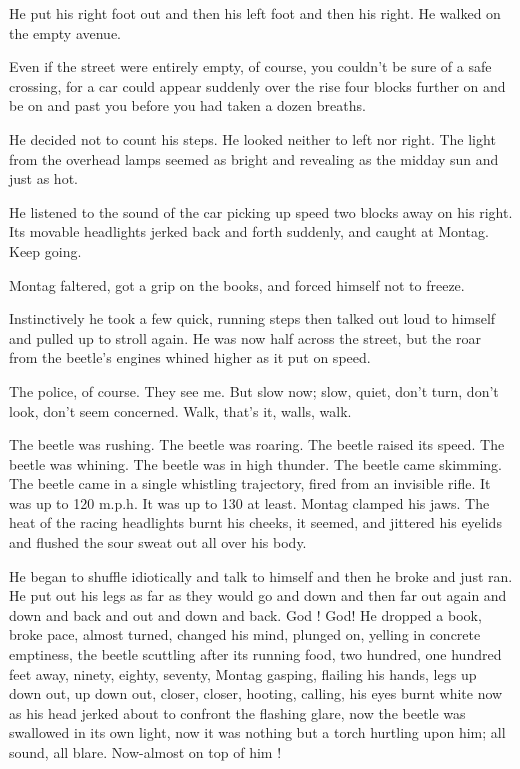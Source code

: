 \documentclass[11pt,openany]{book}
\begin{document}
He put his right foot out and then his left foot and then his right. He walked on the empty avenue.

Even if the street were entirely empty, of course, you couldn't be sure of a safe crossing, for a car could appear suddenly over the rise four blocks further on and be on and past you before you had taken a dozen breaths.

He decided not to count his steps. He looked neither to left nor right. The light from the overhead lamps seemed as bright and revealing as the midday sun and just as hot.

He listened to the sound of the car picking up speed two blocks away on his right. Its movable headlights jerked back and forth suddenly, and caught at Montag. Keep going.

Montag faltered, got a grip on the books, and forced himself not to freeze.

Instinctively he took a few quick, running steps then talked out loud to himself and pulled up to stroll again. He was now half across the street, but the roar from the beetle's engines whined higher as it put on speed.

The police, of course. They see me. But slow now; slow, quiet, don't turn, don't look, don't seem concerned. Walk, that's it, walls, walk.

The beetle was rushing. The beetle was roaring. The beetle raised its speed. The beetle was whining. The beetle was in high thunder. The beetle came skimming. The beetle came in a single whistling trajectory, fired from an invisible rifle. It was up to 120 m.p.h. It was up to 130 at least. Montag clamped his jaws. The heat of the racing headlights burnt his cheeks, it seemed, and jittered his eyelids and flushed the sour sweat out all over his body.

He began to shuffle idiotically and talk to himself and then he broke and just ran. He put out his legs as far as they would go and down and then far out again and down and back and out and down and back. God ! God! He dropped a book, broke pace, almost turned, changed his mind, plunged on, yelling in concrete emptiness, the beetle scuttling after its running food, two hundred, one hundred feet away, ninety, eighty, seventy, Montag gasping, flailing his hands, legs up down out, up down out, closer, closer, hooting, calling, his eyes burnt white now as his head jerked about to confront the flashing glare, now the beetle was swallowed in its own light, now it was nothing but a torch hurtling upon him; all sound, all blare. Now-almost on top of him !
\end{document}
